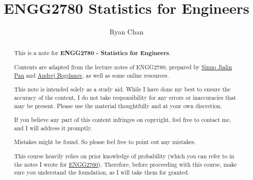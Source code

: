 \documentclass[a4paper]{report}
\author{Ryan Chan}
\title{ENGG2780 Statistics for Engineers}
\begin{document}
\setlength\parindent{0pt}

\maketitle

\newpage

\begin{abstract}
	This is a note for \textbf{ENGG2780 - Statistics for Engineers}.
	
	Contents are adapted from the lecture notes of ENGG2780, prepared by \href{https://www.cse.cuhk.edu.hk/~sinnopan/}{Sinno Jialin Pan} and \href{https://andrejb.net}{Andrej Bogdanov}, as well as some online resources.

	This note is intended solely as a study aid. While I have done my best to ensure the accuracy of the content, I do not take responsibility for any errors or inaccuracies that may be present. Please use the material thoughtfully and at your own discretion.
	
	If you believe any part of this content infringes on copyright, feel free to contact me, and I will address it promptly.

	Mistakes might be found. So please feel free to point out any mistakes.
	
	This course heavily relies on prior knowledge of probability (which you can refer to in the notes I wrote for \href{https://www.ryanc.wtf/files/ENGG2760.pdf}{ENGG2760}). Therefore, before proceeding with this course, make sure you understand the foundation, as I will take them for granted.
\end{abstract}

\newpage

\tableofcontents

\setlength{\parskip}{5pt}
\appendix

\end{document}
